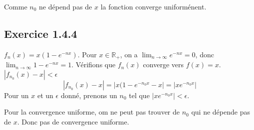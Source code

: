 \documentclass[]{book}
\theoremstyle{definition}
\newcommand{\bb}[1]{\mathbb{#1}}
\newcommand{\R}{\bb{R}}
\begin{document}
Comme $n_0$ ne d\'epend pas de $x$ la fonction converge uniform\'enent.

\subsection*{Exercice 1.4.4}
$f_n(x) = x(1-e^{-nx})$. Pour $x \in \R_{+}$, on a $\lim_{n \to \infty}{ e^{-nx}} = 0$, donc $\lim_{n \to \infty}{1 - e^{-nx}} = 1$. V\'erifions que $f_n(x)$ converge vers $f(x)=x$. $|f_{n_0}(x) - x| < \epsilon$
$$
|f_{n_0}(x) - x| = \left|x(1-e^{-n_0x} -x \right| = \left| xe^{-n_0x} \right| 
$$
Pour un $x$ et un $\epsilon$ donn\'e, prenons un $n_0$ tel que $\left| xe^{-n_0x} \right| < \epsilon$.

Pour la convergence uniforme, om ne peut pas trouver de $n_0$ qui ne d\'epende pas de $x$. Donc pas de convergence uniforme.
\end{document}
